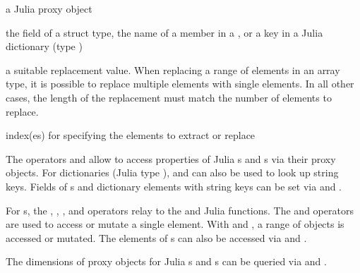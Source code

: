 %
\begin{Arguments}
\begin{ldescription}
\item[\code{x}] a Julia proxy object

\item[\code{name}] the field of a struct type, the name of a member in a ,
or a key in a Julia dictionary (type )

\item[\code{value}] a suitable replacement value.
When replacing a range of elements in an array type, it is possible to
replace multiple elements with single elements. In all other cases,
the length of the replacement must match the number of elements to replace.

\item[\code{i, j, k, ...}] index(es) for specifying the elements to extract or replace
\end{ldescription}
\end{Arguments}
%
\begin{Details}\relax
The operators \code{\$} and \code{[[} allow to access properties of Julia s
and s via their proxy objects.
For dictionaries (Julia type ), \code{\$} and \code{[[}
can also be used to look up string keys.
Fields of s and dictionary elements with string keys
can be set via \code{\$<-} and \code{[[<-}.

For s, the \code{[}, \code{[<-}, \code{[[}, and \code{[[<-}
operators relay to the  and  Julia functions.
The \code{[[} and \code{[[<-} operators are used to access or mutate a single element.
With \code{[} and \code{[<-}, a range of objects is accessed or mutated.
The elements of s can also be accessed via \code{[} and \code{[[}.

The dimensions of proxy objects for Julia s and s
can be queried via  and .
\end{Details}
%
